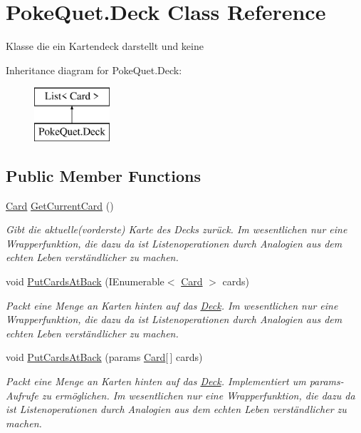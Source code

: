 \hypertarget{class_poke_quet_1_1_deck}{}\section{Poke\+Quet.\+Deck Class Reference}
\label{class_poke_quet_1_1_deck}


Klasse die ein Kartendeck darstellt und keine  


Inheritance diagram for Poke\+Quet.\+Deck\+:\begin{figure}[H]
\begin{center}
\leavevmode
\includegraphics[height=2.000000cm]{class_poke_quet_1_1_deck}
\end{center}
\end{figure}
\subsection*{Public Member Functions}
\begin{DoxyCompactItemize}
\item 
\mbox{\hyperlink{class_poke_quet_1_1_card}{Card}} \mbox{\hyperlink{class_poke_quet_1_1_deck_a54d648dd64cb769d6817cc4bcf0e9af2}{Get\+Current\+Card}} ()
\begin{DoxyCompactList}\small\item\em Gibt die aktuelle(vorderste) Karte des Decks zurück. Im wesentlichen nur eine Wrapperfunktion, die dazu da ist Listenoperationen durch Analogien aus dem echten Leben verständlicher zu machen. \end{DoxyCompactList}\item 
void \mbox{\hyperlink{class_poke_quet_1_1_deck_a48673ad29ddff99adc0d494192d5f47c}{Put\+Cards\+At\+Back}} (I\+Enumerable$<$ \mbox{\hyperlink{class_poke_quet_1_1_card}{Card}} $>$ cards)
\begin{DoxyCompactList}\small\item\em Packt eine Menge an Karten hinten auf das \mbox{\hyperlink{class_poke_quet_1_1_deck}{Deck}}. Im wesentlichen nur eine Wrapperfunktion, die dazu da ist Listenoperationen durch Analogien aus dem echten Leben verständlicher zu machen. \end{DoxyCompactList}\item 
void \mbox{\hyperlink{class_poke_quet_1_1_deck_ae72396d102166a59850288ccb5be7fd1}{Put\+Cards\+At\+Back}} (params \mbox{\hyperlink{class_poke_quet_1_1_card}{Card}}\mbox{[}$\,$\mbox{]} cards)
\begin{DoxyCompactList}\small\item\em Packt eine Menge an Karten hinten auf das \mbox{\hyperlink{class_poke_quet_1_1_deck}{Deck}}. Implementiert um params-\/\+Aufrufe zu ermöglichen. Im wesentlichen nur eine Wrapperfunktion, die dazu da ist Listenoperationen durch Analogien aus dem echten Leben verständlicher zu machen. \end{DoxyCompactList}\end{DoxyCompactItemize}

